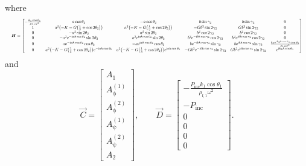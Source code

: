 where
\begin{equation*}\resizebox{\textwidth}{!}{$
\vec{H} =
\begin{bmatrix} 
-{\frac {k_1\cos \theta_1}{\rho_{\mathrm{f,1}}{\omega}^{2}}}&a\cos \theta_2 &-a\cos \theta_2 &b\sin \gamma_2 &b\sin \gamma_2&0\\ 
1&a^2 \left( -K-G \left(\frac13 + \cos 2\theta_2\right)  \right) & a^2 \left( -K-G \left(\frac13 + \cos 2\theta_2\right)  \right) &-G b^2\sin 2\gamma_2 &G b^2\sin 2\gamma_2 &0\\ 
0&- a^2\sin 2\theta_2 &a^2\sin 2\theta_2 & b^2\cos 2\gamma_2 & b^2\cos 2\gamma_2 &0\\ 
0&- a^2 \euler^{-\imag ah\cos \theta_2 }\sin 2\theta_2& a^2 \euler^{\imag ah\cos \theta_2 }\sin 2\theta_2 & b^2 \euler^{-\imag bh\cos \gamma_2}\cos 2\gamma_2& b^2 \euler^{\imag bh\cos \gamma_2}\cos 2\gamma_2 & 0 \\ 
0&a \euler^{-\imag ah\cos \theta_2 }\cos \theta_2 &-a \euler^{\imag ah\cos \theta_2 }\cos \theta_2 & b\euler^{-\imag bh\cos \gamma_2}\sin \gamma_2 & b\euler^{\imag bh\cos \gamma_2}\sin \gamma_2 & \frac { k_2\euler^{\imag k_2h\cos \theta_3 }\cos \theta_3}{\rho_{\mathrm{f,2}}{\omega}^{2}}\\ 
0& a^2 \left( -K-G \left(\frac13 +  \cos 2\theta_2 \right)  \right) {\euler^{-\imag ah\cos \theta_2 }}& a^2 \left( -K-G \left( \frac13+\cos 2\theta_2 \right) \right) {\euler^{\imag ah\cos \theta_2 }}&-G b^2 \euler^{-\imag bh\cos \gamma_2}\sin 2\gamma_2&G b^2 \euler^{\imag bh\cos \gamma_2}\sin 2\gamma_2&  \euler^{\imag k_2h\cos \theta_3}
\end{bmatrix}
$}
\end{equation*}
and
\begin{equation*}
\vec{C} = 
\begin{bmatrix}
	A_1\\
	A_\upphi^{(1)}\\
	A_\upphi^{(2)}\\
	A_\uppsi^{(1)}\\
	A_\uppsi^{(2)}\\
	A_2
\end{bmatrix},\qquad
\vec{D} = 
\begin{bmatrix} 
-\frac{P_{\mathrm{inc}}k_1\cos\theta_1}{\rho_{\mathrm{f,1}}{\omega}^{2}}\\ 
-P_{\mathrm{inc}}\\
0\\ 
0\\ 
0\\
0
\end{bmatrix}.
\end{equation*}
